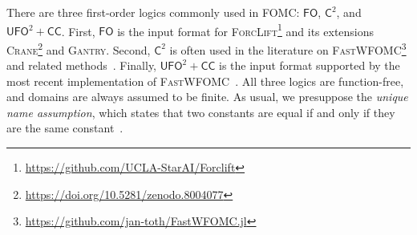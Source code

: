 \documentclass[a4paper,UKenglish,cleveref, autoref, thm-restate]{lipics-v2021}
\newcommand{\cmark}{\ding{51}}
\newcommand{\xmark}{\ding{55}}
\newcommand{\Ctwo}{$\mathsf{C}^{2}$}
\newcommand{\FO}{$\mathsf{FO}$}
\newcommand{\UFO}{$\mathsf{UFO}^{2} + \mathsf{CC}$}
\newcommand{\Cranetwo}{\textsc{Gantry}}
\begin{document}

\renewcommand*{\thefootnote}{\fnsymbol{footnote}}

There are three first-order logics commonly used in FOMC: \FO{}, \Ctwo{}, and
\UFO{}. First, \FO{} is the input format for
\textsc{ForcLift}\footnote{\url{https://github.com/UCLA-StarAI/Forclift}} and
its extensions
\textsc{Crane}\footnote{\url{https://doi.org/10.5281/zenodo.8004077}} and
\Cranetwo{}. Second, \Ctwo{} is often used in the literature on
\textsc{FastWFOMC}\footnote{\url{https://github.com/jan-toth/FastWFOMC.jl}} and
related methods~\cite{DBLP:journals/jair/Kuzelka21,DBLP:conf/aaai/MalhotraS22}.
Finally, \UFO{} is the input format supported by the most recent implementation
of \textsc{FastWFOMC}~\cite{tóth2024complexityweightedfirstordermodel}. All
three logics are function-free, and domains are always assumed to be finite. As
usual, we presuppose the \emph{unique name assumption}, which states that two
constants are equal if and only if they are the same
constant~\cite{DBLP:books/aw/RN2020}.

\renewcommand*{\thefootnote}{\arabic{footnote}}
\end{document}
